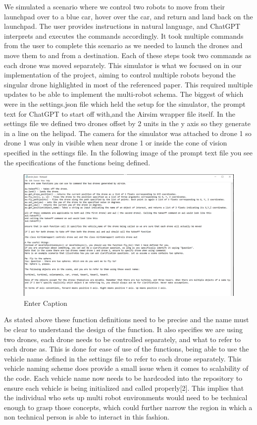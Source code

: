 \documentclass[journal]{IEEEtran}
\begin{document}
We simulated a scenario where we control two robots to move from their launchpad over to a blue car, hover over the car, and return and land back on the launchpad. The user provides instructions in natural language, and ChatGPT interprets and executes the commands accordingly. It took multiple commands from the user to complete this scenario as we needed to launch the drones and move them to and from a destination. Each of these steps took two commands as each drone was moved separately. This simulator is what we focused on in our implementation of the project, aiming to control multiple robots beyond the singular drone highlighted in most of the referenced paper. This required multiple updates to be able to implement the multi-robot schema. The biggest of which were in the settings.json file which held the setup for the simulator, the prompt text for ChatGPT to start off with,and the Airsim wrapper file itself. In the settings file we defined two drones offset by 2 units in the y axis so they generate in a line on the helipad. The camera for the simulator was attached to drone 1 so drone 1 was only in visible when near drone 1 or inside the cone of vision specified in the settings file. In the following image of the prompt text file you see the specifications of the functions being defined. 
\begin{figure}[h]
    \centering
    \includegraphics[width=1\linewidth]{prompt.PNG}
    \caption{Enter Caption}
    \label{fig:enter-label}
\end{figure}
As stated above these function definitions need to be precise and the name must be clear to understand the design of the function. It also specifies we are using two drones, each drone needs to be controlled separately, and what to refer to each drone as. This is done for ease of use of the functions, being able to use the vehicle name defined in the settings file to refer to each drone separately. This vehicle naming scheme does provide a small issue when it comes to scalability of the code. Each vehicle name now needs to be hardcoded into the repository to ensure each vehicle is being initialized and called properly[2]. This implies that the individual who sets up multi robot environments would need to be technical enough to grasp those concepts, which could further narrow the region in which a non technical person is able to interact in this fashion.
\end{document}
